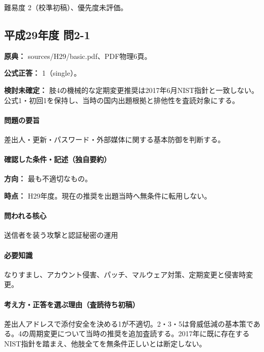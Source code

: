 \par 難易度 2（校準初稿）、優先度未評価。

\subsection{平成29年度 問2-1}
\label{q:h29-reg-basic-2-1}

\noindent\textbf{原典：} sources/H29/basic.pdf、PDF物理6頁。

\textbf{公式正答：} 1（single）。

\par\textbf{検討未確定：} 肢4の機械的な定期変更推奨は2017年6月NIST指針と一致しない。公式1・初回1を保持し、当時の国内出題根拠と排他性を査読対象にする。

\paragraph{問題の要旨} 差出人・更新・パスワード・外部媒体に関する基本防御を判断する。

\paragraph{確認した条件・記述（独自要約）}\mbox{}\par

\noindent\textbf{方向：} 最も不適切なもの。\par

\noindent\textbf{時点：} H29年度。現在の推奨を出題当時へ無条件に転用しない。\par

\paragraph{問われる核心} 送信者を装う攻撃と認証秘密の運用

\paragraph{必要知識} なりすまし、アカウント侵害、パッチ、マルウェア対策、定期変更と侵害時変更。

\paragraph{考え方・正答を選ぶ理由（査読待ち初稿）} 差出人アドレスで添付安全を決める1が不適切。2・3・5は脅威低減の基本策である。4の周期変更について当時の推奨を追加査読する。2017年に既に存在するNIST指針を踏まえ、他肢全てを無条件正しいとは断定しない。

